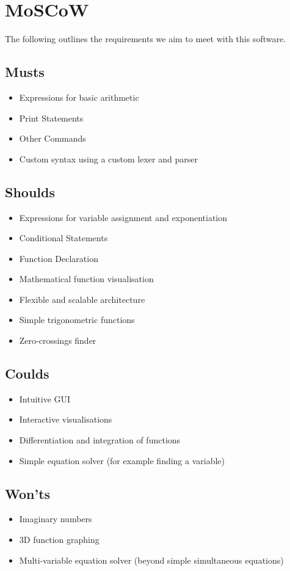 \documentclass[a4paper, oneside, 11pt]{report}
\begin{document}
\section{MoSCoW}
The following outlines the requirements we aim to meet with this software.

\subsection{Musts}

\begin{itemize}
	\item Expressions for basic arithmetic
	\item Print Statements
	\item Other Commands
	\item Custom syntax using a custom lexer and parser
\end{itemize}

\subsection{Shoulds}

\begin{itemize}
	\item Expressions for variable assignment and exponentiation
	\item Conditional Statements
	\item Function Declaration
	\item Mathematical function visualisation
	\item Flexible and scalable architecture
	\item Simple trigonometric functions
	\item Zero-crossings finder
\end{itemize}

\subsection{Coulds}
\begin{itemize}
	\item Intuitive GUI
	\item Interactive visualisations
	\item Differentiation and integration of functions
	\item Simple equation solver (for example finding a variable)
\end{itemize}

\subsection{Won'ts}
\begin{itemize}
	\item Imaginary numbers
	\item 3D function graphing
	\item Multi-variable equation solver (beyond simple simultaneous equations)
\end{itemize}
\end{document}

